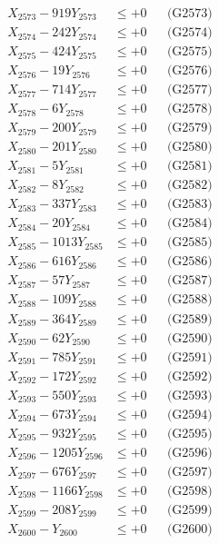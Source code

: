 \documentclass[a4paper,10pt]{article}
\begin{document}
{\begin{align}
X_{2573} - 919Y_{2573} &\leq +0 && \text{(G2573)} \\
X_{2574} - 242Y_{2574} &\leq +0 && \text{(G2574)} \\
X_{2575} - 424Y_{2575} &\leq +0 && \text{(G2575)} \\
X_{2576} - 19Y_{2576} &\leq +0 && \text{(G2576)} \\
X_{2577} - 714Y_{2577} &\leq +0 && \text{(G2577)} \\
X_{2578} - 6Y_{2578} &\leq +0 && \text{(G2578)} \\
X_{2579} - 200Y_{2579} &\leq +0 && \text{(G2579)} \\
X_{2580} - 201Y_{2580} &\leq +0 && \text{(G2580)} \\
\allowbreak
X_{2581} - 5Y_{2581} &\leq +0 && \text{(G2581)} \\
X_{2582} - 8Y_{2582} &\leq +0 && \text{(G2582)} \\
X_{2583} - 337Y_{2583} &\leq +0 && \text{(G2583)} \\
X_{2584} - 20Y_{2584} &\leq +0 && \text{(G2584)} \\
X_{2585} - 1013Y_{2585} &\leq +0 && \text{(G2585)} \\
X_{2586} - 616Y_{2586} &\leq +0 && \text{(G2586)} \\
X_{2587} - 57Y_{2587} &\leq +0 && \text{(G2587)} \\
X_{2588} - 109Y_{2588} &\leq +0 && \text{(G2588)} \\
X_{2589} - 364Y_{2589} &\leq +0 && \text{(G2589)} \\
X_{2590} - 62Y_{2590} &\leq +0 && \text{(G2590)} \\
\allowbreak
X_{2591} - 785Y_{2591} &\leq +0 && \text{(G2591)} \\
X_{2592} - 172Y_{2592} &\leq +0 && \text{(G2592)} \\
X_{2593} - 550Y_{2593} &\leq +0 && \text{(G2593)} \\
X_{2594} - 673Y_{2594} &\leq +0 && \text{(G2594)} \\
X_{2595} - 932Y_{2595} &\leq +0 && \text{(G2595)} \\
X_{2596} - 1205Y_{2596} &\leq +0 && \text{(G2596)} \\
X_{2597} - 676Y_{2597} &\leq +0 && \text{(G2597)} \\
X_{2598} - 1166Y_{2598} &\leq +0 && \text{(G2598)} \\
X_{2599} - 208Y_{2599} &\leq +0 && \text{(G2599)} \\
X_{2600} - Y_{2600} &\leq +0 && \text{(G2600)} \\

\end{align}}
\end{document}
